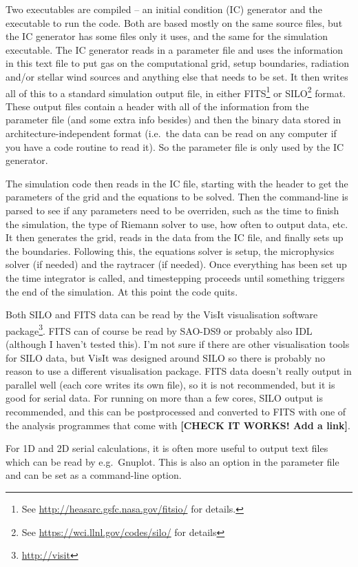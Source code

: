 \documentclass[a4paper,11pt]{report}
\begin{document}
Two executables are compiled -- an initial condition (IC) generator and the executable to run the code.
Both are based mostly on the same source files, but the IC generator has some files only it uses, and the same for the simulation executable.
The IC generator reads in a parameter file and uses the information in this text file to put gas on the computational grid, setup boundaries, radiation and/or stellar wind sources and anything else that needs to be set.
It then writes all of this to a standard simulation output file, in either FITS\footnote{See \url{http://heasarc.gsfc.nasa.gov/fitsio/} for details.} or SILO\footnote{See \url{https://wci.llnl.gov/codes/silo/} for details} format.
These output files contain a header with all of the information from the parameter file (and some extra info besides) and then the binary data stored in architecture-independent format (i.e.\ the data can be read on any computer if you have a code routine to read it).
So the parameter file is only used by the IC generator.

The simulation code then reads in the IC file, starting with the header to get the parameters of the grid and the equations to be solved.
Then the command-line is parsed to see if any parameters need to be overriden, such as the time to finish the simulation, the type of Riemann solver to use, how often to output data, etc.
It then generates the grid, reads in the data from the IC file, and finally sets up the boundaries.
Following this, the equations solver is setup, the microphysics solver (if needed) and the raytracer (if needed).
Once everything has been set up the time integrator is called, and timestepping proceeds until something triggers the end of the simulation.
At this point the code quits.


Both SILO and FITS data can be read by the VisIt visualisation software package\footnote{\url{http://visit}}.
FITS can of course be read by SAO-DS9 or probably also IDL (although I haven't tested this).
I'm not sure if there are other visualisation tools for SILO data, but VisIt was designed around SILO so there is probably no reason to use a different visualisation package.
FITS data doesn't really output in parallel well (each core writes its own file), so it is not recommended, but it is good for serial data.
For running on more than a few cores, SILO output is recommended, and this can be postprocessed and converted to FITS with one of the analysis programmes that come with \pion{} \textbf{[CHECK IT WORKS!  Add a link]}.

For 1D and 2D serial calculations, it is often more useful to output text files which can be read by e.g.\ Gnuplot.
This is also an option in the parameter file and can be set as a command-line option.
\end{document}
